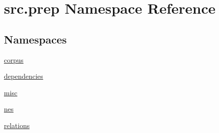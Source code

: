 \hypertarget{namespacesrc_1_1prep}{}\section{src.\+prep Namespace Reference}
\label{namespacesrc_1_1prep}
\subsection*{Namespaces}
\begin{DoxyCompactItemize}
\item 
 \hyperlink{namespacesrc_1_1prep_1_1corpus}{corpus}
\item 
 \hyperlink{namespacesrc_1_1prep_1_1dependencies}{dependencies}
\item 
 \hyperlink{namespacesrc_1_1prep_1_1misc}{misc}
\item 
 \hyperlink{namespacesrc_1_1prep_1_1nes}{nes}
\item 
 \hyperlink{namespacesrc_1_1prep_1_1relations}{relations}
\end{DoxyCompactItemize}
